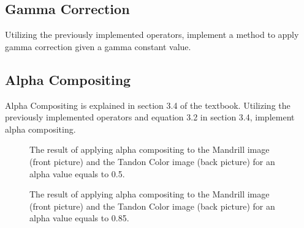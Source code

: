\documentclass[11pt]{article}
\begin{document}
\subsection{Gamma Correction}
\vspace{-3mm}

Utilizing the previously implemented operators, implement a method to apply gamma correction given a gamma constant value.

\subsection{Alpha Compositing}
\vspace{-3mm}

Alpha Compositing is explained in section 3.4 of the textbook. Utilizing the previously implemented operators and equation 3.2 in section 3.4, implement alpha compositing.

\begin{figure}[t]
  \centering
  \caption{The result of applying alpha compositing to the Mandrill image (front picture) and the Tandon Color image (back picture) for an alpha value equals to 0.5.}
  \label{fig:alpha50}
  \vspace*{-3.5mm}  
\end{figure}

\begin{figure}[t]
  \centering
  \caption{The result of applying alpha compositing to the Mandrill image (front picture) and the Tandon Color image (back picture) for an alpha value equals to 0.85.}
  \label{fig:alpha85}
  \vspace*{-3.5mm}  
\end{figure}
\end{document}
